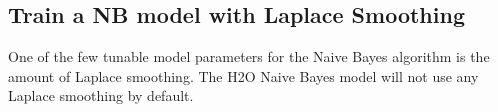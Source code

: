 \documentclass[]{book}
\newenvironment{Shaded}{\begin{snugshade}}{\end{snugshade}}
\newcommand{\CommentTok}[1]{\textcolor[rgb]{0.56,0.35,0.01}{\textit{#1}}}
\newcommand{\DataTypeTok}[1]{\textcolor[rgb]{0.13,0.29,0.53}{#1}}
\newcommand{\DecValTok}[1]{\textcolor[rgb]{0.00,0.00,0.81}{#1}}
\newcommand{\ErrorTok}[1]{\textcolor[rgb]{0.64,0.00,0.00}{\textbf{#1}}}
\newcommand{\KeywordTok}[1]{\textcolor[rgb]{0.13,0.29,0.53}{\textbf{#1}}}
\newcommand{\NormalTok}[1]{#1}
\newcommand{\OperatorTok}[1]{\textcolor[rgb]{0.81,0.36,0.00}{\textbf{#1}}}
\newcommand{\StringTok}[1]{\textcolor[rgb]{0.31,0.60,0.02}{#1}}
\begin{document}
\begin{Shaded}
\end{Shaded}

\hypertarget{train-a-nb-model-with-laplace-smoothing}{%
\subsection{Train a NB model with Laplace Smoothing}\label{train-a-nb-model-with-laplace-smoothing}}

One of the few tunable model parameters for the Naive Bayes algorithm is the amount of Laplace
smoothing. The H2O Naive Bayes model will not use any Laplace smoothing by default.
\end{document}
